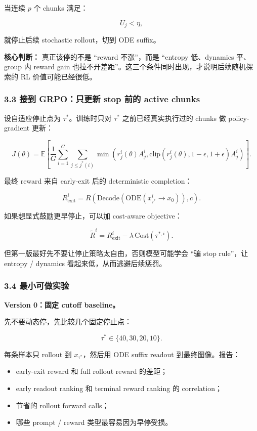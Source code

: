 当连续 \(p\) 个 chunks 满足：

\[
U_j < \eta,
\]

就停止后续 stochastic rollout，切到 ODE suffix。

\begin{summarybox}
\textbf{核心判断：} 真正该停的不是 ``reward 不涨''，而是 ``entropy 低、dynamics 平、group 内 reward gain 也拉不开差距''。这三个条件同时出现，才说明后续随机探索的 RL 价值可能已经很低。
\end{summarybox}

\subsubsection{3.3 接到 GRPO：只更新 stop 前的 active chunks}

设自适应停止点为 \(\tau^*\)。训练时只对 \(\tau^*\) 之前已经真实执行过的 chunks 做 policy-gradient 更新：

\[
J(\theta)
=
\mathbb{E}
\left[
\frac{1}{G}\sum_{i=1}^{G}
\sum_{j\leq j^*(i)}
\min\left(
 r^i_j(\theta)A^i_j,
 \mathrm{clip}(r^i_j(\theta),1-\epsilon,1+\epsilon)A^i_j
\right)
\right].
\]

最终 reward 来自 early-exit 后的 deterministic completion：

\[
R^i_{\mathrm{exit}}
=
R\left(
\mathrm{Decode}\left(
\mathrm{ODE}(x^i_{\tau^*}\rightarrow x_0)
\right),c
\right).
\]

如果想显式鼓励更早停止，可以加 cost-aware objective：

\[
\tilde{R}^i
=
R^i_{\mathrm{exit}}
-
\lambda\,\mathrm{Cost}(\tau^{*,i}).
\]

但第一版最好先不要让停止策略太自由，否则模型可能学会 ``骗 stop rule''，让 entropy / dynamics 看起来低，从而逃避后续惩罚。

\subsubsection{3.4 最小可做实验}

\textbf{Version 0：固定 cutoff baseline。}

先不要动态停，先比较几个固定停止点：

\[
\tau^*\in\{40,30,20,10\}.
\]

每条样本只 rollout 到 \(x_{\tau^*}\)，然后用 ODE suffix readout 到最终图像。报告：

\begin{itemize}[leftmargin=1.5em]
  \item early-exit reward 和 full rollout reward 的差距；
  \item early readout ranking 和 terminal reward ranking 的 correlation；
  \item 节省的 rollout forward calls；
  \item 哪些 prompt / reward 类型最容易因为早停受损。
\end{itemize}

